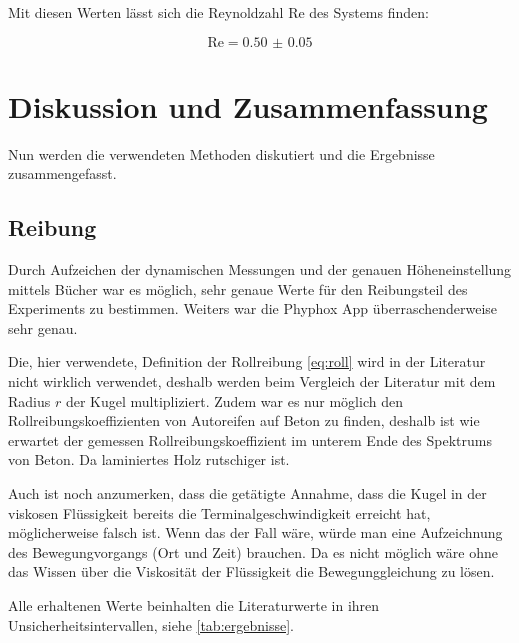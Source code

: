 \documentclass[11pt,ngerman]{scrartcl}
\begin{document}
Mit diesen Werten lässt sich die Reynoldzahl Re des
Systems finden:

\begin{equation}
    \text{Re} = \num{0.50(5)}
\end{equation}


\section{Diskussion und Zusammenfassung}
\label{sec:diskussion_zusammenfassung}

Nun werden die verwendeten Methoden diskutiert und die Ergebnisse 
zusammengefasst.

\subsection{Reibung}
Durch Aufzeichen der dynamischen Messungen und der genauen Höheneinstellung
mittels Bücher war es möglich, sehr genaue Werte für den Reibungsteil des
Experiments zu bestimmen. Weiters war die Phyphox App überraschenderweise sehr
genau.

Die, hier verwendete, Definition der Rollreibung \ref{eq:roll} wird in der
Literatur nicht wirklich verwendet, deshalb werden beim Vergleich der Literatur
mit dem Radius $r$ der Kugel multipliziert. Zudem war es nur möglich den
Rollreibungskoeffizienten von Autoreifen auf Beton
\cite{Rollwiderstandgummi2021} zu finden, deshalb ist wie erwartet der gemessen
Rollreibungskoeffizient im unterem Ende des Spektrums von Beton. Da laminiertes
Holz rutschiger ist.

Auch ist noch anzumerken, dass die getätigte Annahme, dass die Kugel in der
viskosen Flüssigkeit bereits die Terminalgeschwindigkeit erreicht hat,
möglicherweise falsch ist. Wenn das der Fall wäre, würde man eine Aufzeichnung
des Bewegungvorgangs (Ort und Zeit) brauchen. Da es nicht möglich wäre ohne das
Wissen über die Viskosität der Flüssigkeit die Bewegunggleichung zu lösen.

Alle erhaltenen Werte beinhalten die
Literaturwerte in ihren Unsicherheitsintervallen, siehe
\autoref{tab:ergebnisse}.
\end{document}
